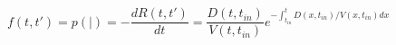 \begin{equation}
f(t,t') = p(|)= -\frac{dR(t,t')}{dt} = \frac{D(t,t_{in})}{V(t,t_{in})}e^{-\int_{t_{in}}^t D(x,t_{in})/V(x,t_{in}) dx}
\end{equation}